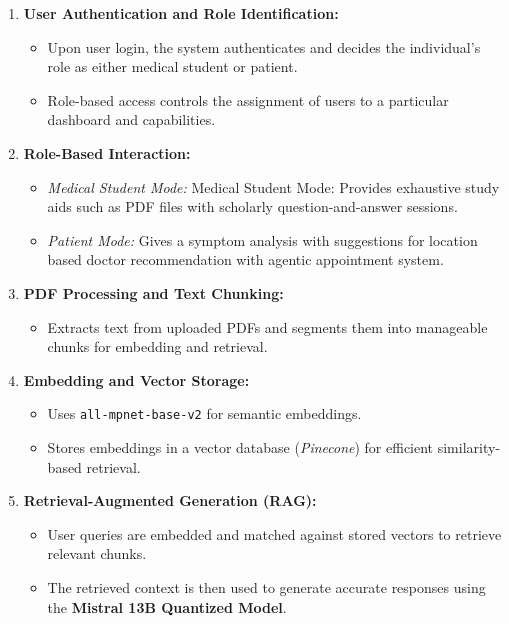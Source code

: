 \vspace{2cm}
\begin{enumerate}
  \item \textbf{User Authentication and Role Identification:} 
    \begin{itemize}
        \item Upon user login, the system authenticates and decides the individual's role as either medical student or patient.
        \item Role-based access controls the assignment of users to a particular dashboard and capabilities.
    \end{itemize}
  \item \textbf{Role-Based Interaction:} 
    \begin{itemize}
        \item \emph{Medical Student Mode:} Medical Student Mode: Provides exhaustive study aids such as PDF files with scholarly question-and-answer sessions.
        \item \emph{Patient Mode:} Gives a symptom analysis with suggestions for location based doctor recommendation with agentic appointment system.
    \end{itemize}
  \item \textbf{PDF Processing and Text Chunking:} 
    \begin{itemize}
        \item Extracts text from uploaded PDFs and segments them into manageable chunks for embedding and retrieval.
    \end{itemize}
  \item \textbf{Embedding and Vector Storage:}
    \begin{itemize}
        \item Uses \texttt{all-mpnet-base-v2} for semantic embeddings.
        \item Stores embeddings in a vector database (\emph{Pinecone}) for efficient similarity-based retrieval.
    \end{itemize}
  \item \textbf{Retrieval-Augmented Generation (RAG):} 
    \begin{itemize}
        \item User queries are embedded and matched against stored vectors to retrieve relevant chunks.
        \item The retrieved context is then used to generate accurate responses using the \textbf{Mistral 13B Quantized Model}.
    \end{itemize}

\end{enumerate}
